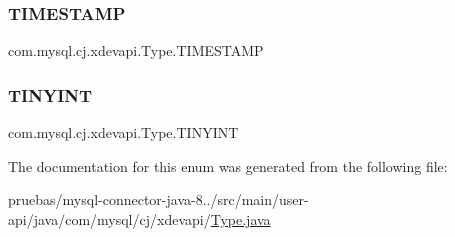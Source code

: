 \subsubsection{\texorpdfstring{T\+I\+M\+E\+S\+T\+A\+MP}{TIMESTAMP}}
{\footnotesize\ttfamily com.\+mysql.\+cj.\+xdevapi.\+Type.\+T\+I\+M\+E\+S\+T\+A\+MP}

\mbox{\label{enumcom_1_1mysql_1_1cj_1_1xdevapi_1_1_type_abb7980c75b380fb05b922cb692e1716d}} 
\subsubsection{\texorpdfstring{T\+I\+N\+Y\+I\+NT}{TINYINT}}
{\footnotesize\ttfamily com.\+mysql.\+cj.\+xdevapi.\+Type.\+T\+I\+N\+Y\+I\+NT}



The documentation for this enum was generated from the following file\+:\begin{DoxyCompactItemize}
\item 
pruebas/mysql-\/connector-\/java-\/8../src/main/user-\/api/java/com/mysql/cj/xdevapi/\mbox{\hyperlink{_type_8java}{Type.\+java}}\end{DoxyCompactItemize}
